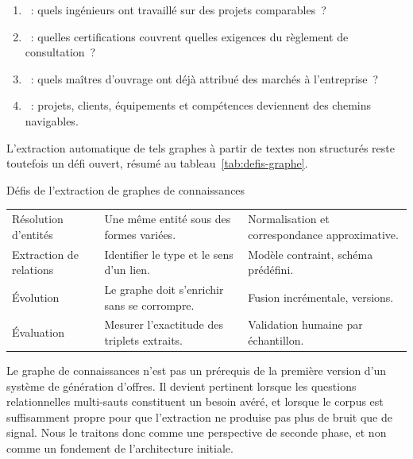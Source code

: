 \begin{enumerate}
  \item {}~: quels ingénieurs ont
        travaillé sur des projets comparables~?
  \item {}~: quelles certifications
        couvrent quelles exigences du règlement de consultation~?
  \item {}~: quels maîtres d'ouvrage ont déjà
        attribué des marchés à l'entreprise~?
  \item {}~: projets, clients,
        équipements et compétences deviennent des chemins navigables.
\end{enumerate}

L'extraction automatique de tels graphes à partir de textes non structurés
reste toutefois un défi ouvert, résumé au tableau~\ref{tab:defis-graphe}.

\begin{btptable}{Défis de l'extraction de graphes de connaissances}
\label{tab:defis-graphe}
\begin{tabularx}{\linewidth}{@{}L{3.4cm} Y Y@{}}
\toprule
{}
 &  &  \\
\midrule
Résolution d'entités & Une même entité sous des formes variées. & Normalisation et correspondance approximative. \\
Extraction de relations & Identifier le type et le sens d'un lien. & Modèle contraint, schéma prédéfini. \\
Évolution & Le graphe doit s'enrichir sans se corrompre. & Fusion incrémentale, versions. \\
Évaluation & Mesurer l'exactitude des triplets extraits. & Validation humaine par échantillon. \\
\bottomrule
\end{tabularx}
\end{btptable}

\begin{btpwarn}[Positionnement]
Le graphe de connaissances n'est pas un prérequis de la première version
d'un système de génération d'offres. Il devient pertinent lorsque les
questions relationnelles multi-sauts constituent un besoin avéré, et
lorsque le corpus est suffisamment propre pour que l'extraction ne
produise pas plus de bruit que de signal. Nous le traitons donc comme une
perspective de seconde phase, et non comme un fondement de l'architecture
initiale.
\end{btpwarn}
